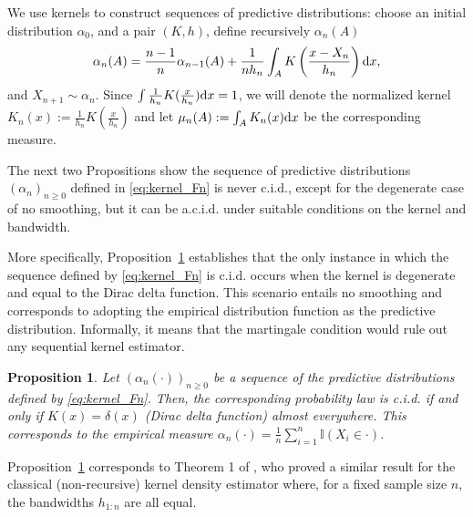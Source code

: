 \documentclass{article}
\newtheorem{proposition}{Proposition}
\theoremstyle{definition}
\newcommand{\di}{{\rm d}}
\renewcommand{\&}{and}
\begin{document}
We use kernels to construct sequences of predictive distributions: choose an initial distribution $\alpha_0$, and a pair $(K,h)$, define recursively $\alpha_{n}(A)$%
\begin{equation} \label{eq:kernel_Fn}
	\alpha_{n}(A)=\frac{n-1}{n}\alpha_{n-1}(A)+\frac{1}{n h_{n}} \int_{A} K\left(\frac{x-X_{n}}{h_{n}}\right) \di x,
\end{equation}
and $X_{n+1} \sim \alpha_n$. Since $\int \frac{1}{h_n} K(\frac{x}{h_n}) \di x =1$, we will denote the normalized kernel $K_n (x) := \frac{1}{h_n} K(\frac{x}{h_n})$ and let $\mu_n (A):= \int_A K_n (x) \di x$ be the corresponding measure. 

 

The next two Propositions show the sequence of predictive distributions $(\alpha_n)_{n\geq0}$ defined in \eqref{eq:kernel_Fn} is never c.i.d., except for the degenerate case of no smoothing, but it can be a.c.i.d. under suitable conditions on the kernel and bandwidth. 

More specifically, Proposition~\ref{prop:kernel.cid} establishes that the only instance in which the sequence defined by \eqref{eq:kernel_Fn} is c.i.d. occurs when the kernel is degenerate and equal to the Dirac delta function. This scenario entails no smoothing and corresponds to adopting the empirical distribution function as the predictive distribution. %
Informally, it means that the martingale condition would rule out any sequential kernel estimator. 

\begin{proposition}\label{prop:kernel.cid}
	Let $(\alpha_{n}(\cdot))_{n\geq0}$ be a sequence of the predictive distributions defined by \eqref{eq:kernel_Fn}. Then, the corresponding probability law is c.i.d. if and only if $K(x)=\delta(x)$ (Dirac delta function) almost everywhere. This corresponds to the empirical measure $\alpha_{n}(\cdot)= \frac{1}{n}\sum_{i=1}^{n} \mathbb{I}(X_{i}\in \cdot)$.
\end{proposition}

Proposition~\ref{prop:kernel.cid} corresponds to Theorem 1 of \cite{west1991kernel}, who proved a similar result for the classical (non-recursive) kernel density estimator where, for a fixed sample size $n$, the bandwidths $h_{1:n}$ are all equal. %
\end{document}
